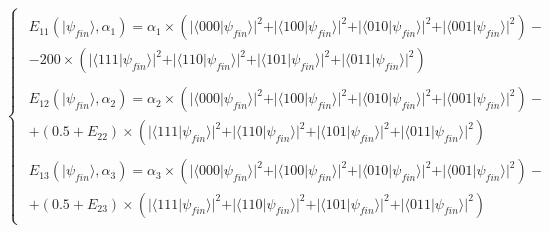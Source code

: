  \begin{equation}
 \begin{cases}
\begin{split}
E_{11}(\vert\psi_{fin}\rangle, \alpha_{1})=\alpha_{1}\times(\vert\langle000\vert\psi_{fin}\rangle\vert^{2} + \vert\langle100\vert\psi_{fin}\rangle\vert^{2}
+ \vert\langle010\vert\psi_{fin}\rangle\vert^{2}
+ \vert\langle001\vert\psi_{fin}\rangle\vert^{2}
 ) - \\
 - 200\times(\vert\langle111\vert\psi_{fin}\rangle\vert^{2} + \vert\langle110\vert\psi_{fin}\rangle\vert^{2}
+ \vert\langle101\vert\psi_{fin}\rangle\vert^{2}
+ \vert\langle011\vert\psi_{fin}\rangle\vert^{2}
 )
\end{split}
\\
\begin{split}
E_{12}(\vert\psi_{fin}\rangle, \alpha_{2})=\alpha_{2}\times(\vert\langle000\vert\psi_{fin}\rangle\vert^{2} + \vert\langle100\vert\psi_{fin}\rangle\vert^{2}
+ \vert\langle010\vert\psi_{fin}\rangle\vert^{2}
+ \vert\langle001\vert\psi_{fin}\rangle\vert^{2}
 ) - \\
 + (0.5 + E_{22})\times(\vert\langle111\vert\psi_{fin}\rangle\vert^{2} + \vert\langle110\vert\psi_{fin}\rangle\vert^{2}
+ \vert\langle101\vert\psi_{fin}\rangle\vert^{2}
+ \vert\langle011\vert\psi_{fin}\rangle\vert^{2}
 )
\end{split}
\\
\begin{split}
E_{13}(\vert\psi_{fin}\rangle, \alpha_{3})=\alpha_{3}\times(\vert\langle000\vert\psi_{fin}\rangle\vert^{2} + \vert\langle100\vert\psi_{fin}\rangle\vert^{2}
+ \vert\langle010\vert\psi_{fin}\rangle\vert^{2}
+ \vert\langle001\vert\psi_{fin}\rangle\vert^{2}
 ) - \\
 + (0.5 + E_{23})\times(\vert\langle111\vert\psi_{fin}\rangle\vert^{2} + \vert\langle110\vert\psi_{fin}\rangle\vert^{2}
+ \vert\langle101\vert\psi_{fin}\rangle\vert^{2}
+ \vert\langle011\vert\psi_{fin}\rangle\vert^{2}
 )
\end{split}
\end{cases}
\label{eq:pirates_payoff32}
\end{equation}

